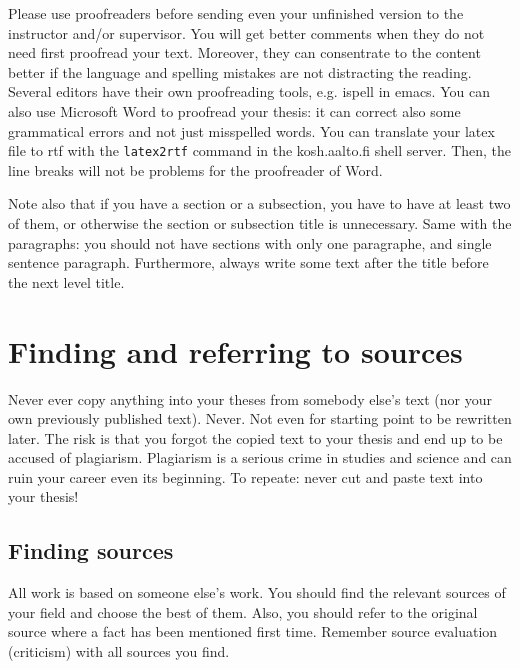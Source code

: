 Please use proofreaders before sending even your unfinished version to
the instructor and/or supervisor. You will get better comments when
they do not need first proofread your text. Moreover, they can
consentrate to the content better if the language and spelling
mistakes are not distracting the reading. Several editors have their
own proofreading tools, e.g. ispell in emacs. You can also use
Microsoft Word to proofread your thesis: it can correct also some
grammatical errors and not just misspelled words. You can translate
your latex file to rtf with the \texttt{latex2rtf} command in the
kosh.aalto.fi shell server. Then, the line breaks
will not be problems for the proofreader of Word.

Note also that if you have a section or a subsection, you have to have
at least two of them, or otherwise the section or subsection title is
unnecessary. Same with the paragraphs: you should not have sections
with only one paragraphe, and single sentence paragraph. Furthermore,
always write some text after the title before the next level title.

\section{Finding and referring to sources}

Never ever copy anything into your theses from somebody else's text
(nor your own previously published text). Never. Not even for starting
point to be rewritten later. The risk is that you forgot the copied
text to your thesis and end up to be accused of plagiarism. Plagiarism
is a serious crime in studies and science and can ruin your career
even its beginning. To repeate: never cut and paste text into your
thesis!

\subsection{Finding sources}

All work is based on someone else's work. You should find the relevant
sources of your field and choose the best of them. Also, you should
refer to the original source where a fact has been mentioned first
time. Remember source evaluation (criticism) with all sources you
find.


